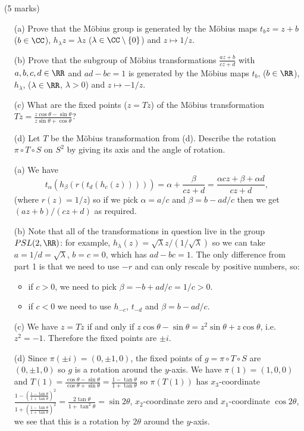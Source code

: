 \documentclass[12pt]{article}
\begin{document}
\begin{question}\ (5 marks)\\
  \begin{enumerate}
  \item[(a)] Prove that the M\"obius group is generated by the M\"obius maps $t_bz=z+b$ ($b\in\CC$), $h_\lambda z=\lambda z$ ($\lambda\in\CC\setminus\{0\}$) and $z\mapsto 1/z$.
  \item[(b)] Prove that the subgroup of M\"obius transformations $\frac{az+b}{cz+d}$ with $a,b,c,d\in\RR$ and $ad-bc=1$ is generated by the M\"obius maps $t_b$, ($b\in\RR$), $h_\lambda$, ($\lambda\in\RR$, $\lambda>0$) and $z\mapsto -1/z$.
  \item[(c)] What are the fixed points ($z=Tz$) of the M\"obius transformation $Tz=\frac{z\cos\theta-\sin\theta}{z\sin\theta+\cos\theta}$?
  \item[(d)] Let $T$ be the M\"obius transformation from (d). Describe the rotation $\pi\circ T\circ S$ on $S^2$ by giving its axis and the angle of rotation.
  \end{enumerate}
\end{question}
\begin{answer}
  \begin{enumerate}
  \item[(a)] We have
    \[t_{\alpha}(h_{\beta}(r(t_d(h_c(z)))))=\alpha+\frac{\beta}{cz+d}=\frac{\alpha cz+\beta+\alpha d}{cz+d},\]
    (where $r(z)=1/z$) so if we pick $\alpha=a/c$ and $\beta=b-ad/c$ then we get $(az+b)/(cz+d)$ as required.
  \item[(b)] Note that all of the transformations in question live in the group $PSL(2,\RR)$: for example, $h_\lambda(z)=\sqrt{\lambda}z/(1/\sqrt{\lambda})$ so we can take $a=1/d=\sqrt{\lambda}$, $b=c=0$, which has $ad-bc=1$. The only difference from part 1 is that we need to use $-r$ and can only rescale by positive numbers, so:
    \begin{itemize}
    \item if $c>0$, we need to pick $\beta=-b+ad/c=1/c>0$.
    \item if $c<0$ we need to use $h_{-c}$, $t_{-d}$ and $\beta=b-ad/c$.
    \end{itemize}
  \item[(c)] We have $z=Tz$ if and only if $z\cos\theta-\sin\theta=z^2\sin\theta+z\cos\theta$, i.e. $z^2=-1$. Therefore the fixed points are $\pm i$.
  \item[(d)] Since $\pi(\pm i)=(0,\pm 1,0)$, the fixed points of $g=\pi\circ T\circ S$ are $(0,\pm 1,0)$ so $g$ is a rotation around the $y$-axis. We have $\pi(1)=(1,0,0)$ and $T(1)=\frac{\cos\theta-\sin\theta}{\cos\theta+\sin\theta}=\frac{1-\tan\theta}{1+\tan\theta}$ so $\pi(T(1))$ has $x_3$-coordinate $\frac{1-\left(\frac{1-\tan\theta}{1+\tan\theta}\right)^2}{1+\left(\frac{1-\tan\theta}{1+\tan\theta}\right)^2}=\frac{2\tan\theta}{1+\tan^2\theta}=\sin 2\theta$, $x_2$-coordinate zero and $x_1$-coordinate $\cos 2\theta$, we see that this is a rotation by $2\theta$ around the $y$-axis.
  \end{enumerate}
\end{answer}
\end{document}
